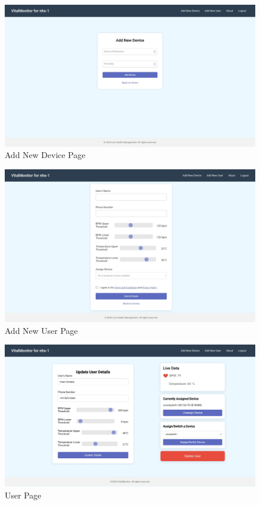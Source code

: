 \begin{figure}[h!]
    \centering
    \includegraphics[width=1\linewidth]{images/dashboard-4.jpeg}
    \caption{Add New Device Page}
    \label{fig:device-page}
\end{figure}

\begin{figure}[h!]
    \centering
    \includegraphics[width=1\linewidth]{images/dashboard-3.jpeg}
    \caption{Add New User Page}
    \label{fig:new-user-page}
\end{figure}

\begin{figure}[h!]
    \centering
    \includegraphics[width=1\linewidth]{images/dashboard-1.jpeg}
    \caption{User Page}
    \label{fig:user-page}
\end{figure}

